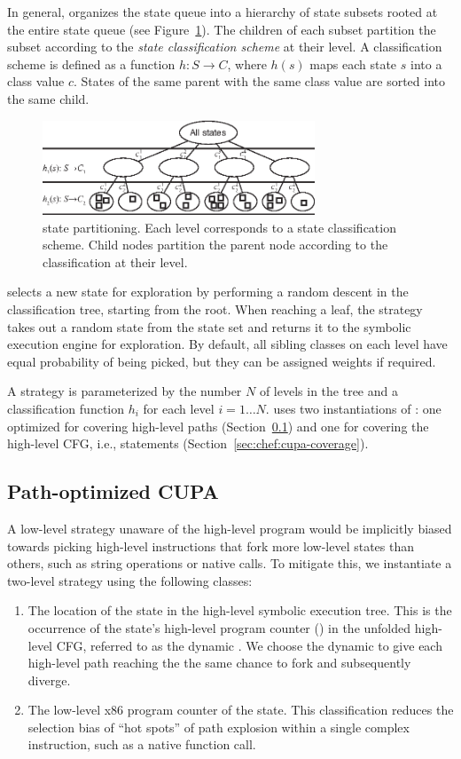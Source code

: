 In general, \cupa organizes the state queue into a hierarchy of state subsets rooted at the entire state queue (see Figure~\ref{fig:cupa}).  The children of each subset partition the subset according to the \emph{state classification scheme} at their level.  A classification scheme is defined as a function $h: S \rightarrow C$, where $h(s)$ maps each state $s$ into a class value $c$.  States of the same parent with the same class value are sorted into the same child.
%
\begin{figure}
  \centering
  \includegraphics[width=3.2in]{figures/cupa/cupa}
  \caption{\cupa state partitioning.  Each level corresponds to a state classification scheme.  Child nodes partition the parent node according to the classification at their level.}
  \label{fig:cupa}
\end{figure}
%
\cupa selects a new state for exploration by performing a random descent in the classification tree, starting from the root.  When reaching a leaf, the strategy takes out a random state from the state set and returns it to the symbolic execution engine for exploration.  By default, all sibling classes on each level have equal probability of being picked, but they can be assigned weights if required.

A \cupa strategy is parameterized by the number $N$ of levels in the tree and a classification function $h_i$ for each level $i=1 \ldots N$.  \chef uses two instantiations of \cupa: one optimized for covering high-level paths (Section~\ref{sec:chef:cupa-paths}) and one for covering the high-level CFG, i.e., statements (Section~\ref{sec:chef:cupa-coverage}).

\subsection{Path-optimized CUPA}
\label{sec:chef:cupa-paths}

A low-level strategy unaware of the high-level program would be implicitly biased towards picking high-level instructions that fork more low-level states than others, such as string operations or native calls.
%
To mitigate this, we instantiate a two-level \cupa strategy using the following classes:
\begin{enumerate}
\item The location of the state in the high-level symbolic execution tree.  This is the occurrence of the state's high-level program counter (\hlpc) in the unfolded high-level CFG, referred to as the dynamic \hlpc.  We choose the dynamic \hlpc to give each high-level path reaching the \hlpc the same chance to fork and subsequently diverge.
\item The low-level x86 program counter of the state.  This classification reduces the selection bias of ``hot spots'' of path explosion within a single complex instruction, such as a native function call.
\end{enumerate}

